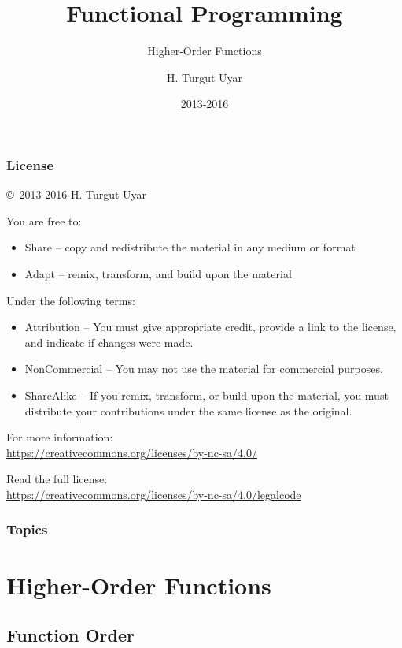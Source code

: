 \documentclass[dvipsnames]{beamer}
\title{Functional Programming}
\subtitle{Higher-Order Functions}
\author{H. Turgut Uyar}
\date{2013-2016}
\theoremstyle{plain}
\begin{document}
\begin{frame}
  \titlepage
\end{frame}

\begin{frame}
  \frametitle{License}

  \hfill
  \copyright~2013-2016 H. Turgut Uyar

  \vfill
  \begin{footnotesize}
    You are free to:
    \begin{itemize}
      \itemsep0em
      \item Share -- copy and redistribute the material in any medium or format
      \item Adapt -- remix, transform, and build upon the material
    \end{itemize}

    Under the following terms:
    \begin{itemize}
      \itemsep0em
      \item Attribution -- You must give appropriate credit, provide a link to
        the license, and indicate if changes were made.

      \item NonCommercial -- You may not use the material for commercial
        purposes.

      \item ShareAlike -- If you remix, transform, or build upon the material,
        you must distribute your contributions under the same license as the
        original.
    \end{itemize}

    For more information:\\
    \url{https://creativecommons.org/licenses/by-nc-sa/4.0/}

    \smallskip
    Read the full license:\\
    \url{https://creativecommons.org/licenses/by-nc-sa/4.0/legalcode}
  \end{footnotesize}
\end{frame}

\begin{frame}
  \frametitle{Topics}
  \tableofcontents
\end{frame}

\section{Higher-Order Functions}

\subsection{Function Order}
\end{document}
